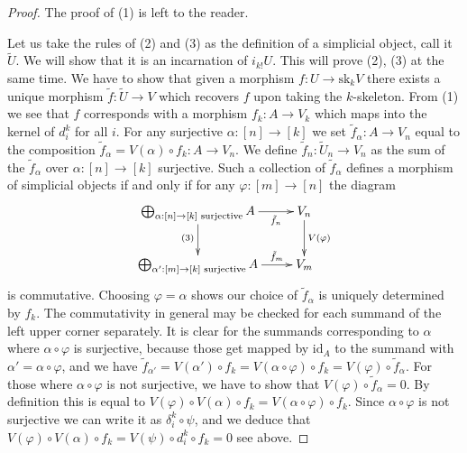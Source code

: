 \begin{proof}
The proof of (1) is left to the reader.

\medskip\noindent
Let us take the rules of (2) and (3)
as the definition of a simplicial object, call it $\tilde U$.
We will show that it is an incarnation of $i_{k!}U$.
This will prove (2), (3) at the same time. We have to show
that given a morphism $f : U \to \text{sk}_kV$
there exists a unique morphism $\tilde f : \tilde U \to V$
which recovers $f$ upon taking the $k$-skeleton.
From (1) we see that $f$ corresponds with a morphism
$f_k : A \to V_k$ which maps into the kernel of
$d^k_i$ for all $i$. For any surjective $\alpha : [n] \to [k]$
we set $\tilde f_\alpha : A \to V_n$ equal to the composition
$\tilde f_\alpha = V(\alpha) \circ f_k : A \to V_n$. We define
$\tilde f_n : \tilde U_n \to V_n$ as the sum of
the $\tilde f_\alpha$ over $\alpha : [n] \to [k]$ surjective.
Such a collection of $\tilde f_\alpha$ defines a morphism
of simplicial objects if and only if
for any $\varphi : [m] \to [n]$ the diagram
$$
\xymatrix{
\bigoplus_{\alpha : [n] \to [k]\text{ surjective}} A
\ar[r]_-{\tilde f_n}
\ar[d]_{(3)} &
V_n \ar[d]^{V(\varphi)} \\
\bigoplus_{\alpha' : [m] \to [k]\text{ surjective}} A
\ar[r]^-{\tilde f_m} &
V_m
}
$$
is commutative. Choosing $\varphi = \alpha$ shows our choice of
$\tilde f_\alpha$ is uniquely determined by $f_k$.
The commutativity in general may be checked for each summand
of the left upper corner separately. It is clear for the
summands corresponding to $\alpha$ where
$\alpha \circ \varphi$ is surjective, because those get
mapped by $\text{id}_A$ to the summand with
$\alpha' = \alpha \circ \varphi$, and we have
$\tilde f_{\alpha'} = V(\alpha') \circ f_k =
V(\alpha \circ \varphi) \circ f_k = V(\varphi) \circ \tilde f_\alpha$.
For those where $\alpha \circ \varphi$
is not surjective, we have to show that $V(\varphi) \circ \tilde f_\alpha = 0$.
By definition this is equal to
$V(\varphi) \circ V(\alpha) \circ f_k = V(\alpha \circ \varphi) \circ f_k$.
Since $\alpha \circ \varphi$ is not surjective we can write it
as $\delta^k_i \circ \psi$, and we deduce that
$V(\varphi) \circ V(\alpha) \circ f_k =
V(\psi) \circ d^k_i \circ f_k = 0$ see above.


\end{proof}
